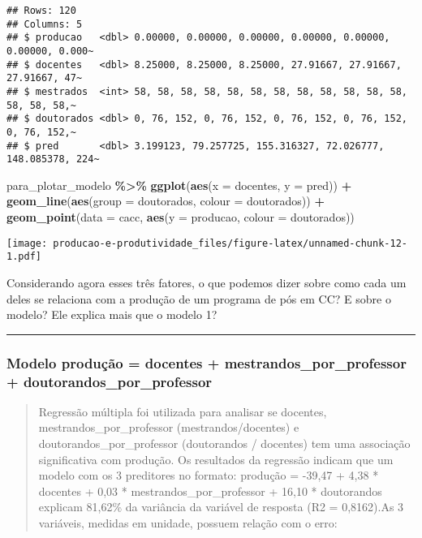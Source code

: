 \documentclass[
]{article}
\newenvironment{Shaded}{\begin{snugshade}}{\end{snugshade}}
\newcommand{\AttributeTok}[1]{\textcolor[rgb]{0.13,0.29,0.53}{#1}}
\newcommand{\FunctionTok}[1]{\textcolor[rgb]{0.13,0.29,0.53}{\textbf{#1}}}
\newcommand{\NormalTok}[1]{#1}
\newcommand{\SpecialCharTok}[1]{\textcolor[rgb]{0.81,0.36,0.00}{\textbf{#1}}}
\begin{document}
\begin{verbatim}
## Rows: 120
## Columns: 5
## $ producao   <dbl> 0.00000, 0.00000, 0.00000, 0.00000, 0.00000, 0.00000, 0.000~
## $ docentes   <dbl> 8.25000, 8.25000, 8.25000, 27.91667, 27.91667, 27.91667, 47~
## $ mestrados  <int> 58, 58, 58, 58, 58, 58, 58, 58, 58, 58, 58, 58, 58, 58, 58,~
## $ doutorados <dbl> 0, 76, 152, 0, 76, 152, 0, 76, 152, 0, 76, 152, 0, 76, 152,~
## $ pred       <dbl> 3.199123, 79.257725, 155.316327, 72.026777, 148.085378, 224~
\end{verbatim}

\begin{Shaded}
\begin{Highlighting}[]
\NormalTok{para\_plotar\_modelo }\SpecialCharTok{\%\textgreater{}\%} 
  \FunctionTok{ggplot}\NormalTok{(}\FunctionTok{aes}\NormalTok{(}\AttributeTok{x =}\NormalTok{ docentes, }\AttributeTok{y =}\NormalTok{ pred)) }\SpecialCharTok{+} 
  \FunctionTok{geom\_line}\NormalTok{(}\FunctionTok{aes}\NormalTok{(}\AttributeTok{group =}\NormalTok{ doutorados, }\AttributeTok{colour =}\NormalTok{ doutorados)) }\SpecialCharTok{+} 
  \FunctionTok{geom\_point}\NormalTok{(}\AttributeTok{data =}\NormalTok{ cacc, }\FunctionTok{aes}\NormalTok{(}\AttributeTok{y =}\NormalTok{ producao, }\AttributeTok{colour =}\NormalTok{ doutorados))}
\end{Highlighting}
\end{Shaded}

\texttt{[image: producao-e-produtividade\_files/figure-latex/unnamed-chunk-12-1.pdf]}

Considerando agora esses três fatores, o que podemos dizer sobre como
cada um deles se relaciona com a produção de um programa de pós em CC? E
sobre o modelo? Ele explica mais que o modelo 1?

\begin{center}\rule{0.5\linewidth}{0.5pt}\end{center}

\hypertarget{modelo-produuxe7uxe3o-docentes-mestrandos_por_professor-doutorandos_por_professor}{%
\subsubsection{Modelo produção = docentes + mestrandos\_por\_professor +
doutorandos\_por\_professor}\label{modelo-produuxe7uxe3o-docentes-mestrandos_por_professor-doutorandos_por_professor}}

\begin{quote}
Regressão múltipla foi utilizada para analisar se docentes,
mestrandos\_por\_professor (mestrandos/docentes) e
doutorandos\_por\_professor (doutorandos / docentes) tem uma associação
significativa com produção. Os resultados da regressão indicam que um
modelo com os 3 preditores no formato: produção = -39,47 + 4,38 *
docentes + 0,03 * mestrandos\_por\_professor + 16,10 * doutorandos
explicam 81,62\% da variância da variável de resposta (R2 = 0,8162).As 3
variáveis, medidas em unidade, possuem relação com o erro:
\end{quote}
\end{document}
